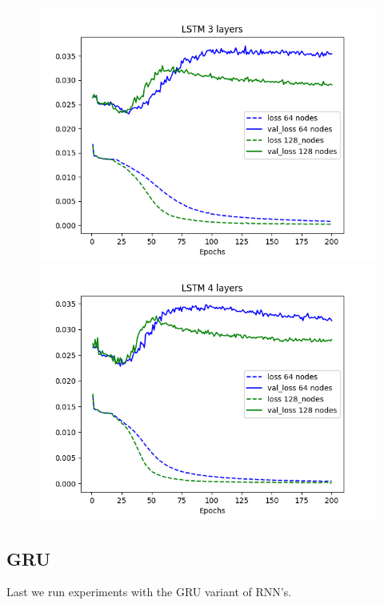 \documentclass[11pt]
{article}
\begin{document}
\begin{figure}[ht]
\begin{minipage}[b]{0.33\linewidth}
		\includegraphics[width=\linewidth]{../TESTS_RESULTS/LSTM_tests/plots/3_comp.png} 
	\end{minipage}%
	\begin{minipage}[b]{0.33\linewidth}
		\centering
		\includegraphics[width=\linewidth]{../TESTS_RESULTS/LSTM_tests/plots/4_comp.png} 
	\end{minipage} 
\end{figure}

\subsection{GRU}
Last we run experiments with the GRU variant of RNN's. 
\end{document}
